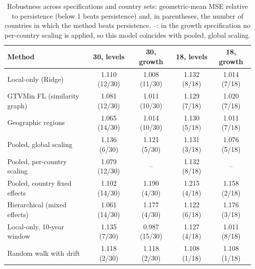 \begin{table}[htbp]
\centering
\caption{Robustness across specifications and country sets: geometric-mean MSE relative to persistence (below 1 beats persistence) and, in parentheses, the number of countries in which the method beats persistence. --: in the growth specification no per-country scaling is applied, so this model coincides with pooled, global scaling.}
\label{tab:robustness}
\begin{tabular}{lcccc}
\toprule
Method & 30, levels & 30, growth & 18, levels & 18, growth \\
\midrule
Local-only (Ridge) & 1.110 (12/30) & 1.008 (11/30) & 1.132 (8/18) & 1.014 (7/18) \\
GTVMin FL (similarity graph) & 1.081 (12/30) & 1.011 (10/30) & 1.129 (7/18) & 1.020 (7/18) \\
Geographic regions & 1.065 (14/30) & 1.014 (10/30) & 1.130 (5/18) & 1.011 (7/18) \\
Pooled, global scaling & 1.136 (6/30) & 1.121 (5/30) & 1.131 (3/18) & 1.076 (5/18) \\
Pooled, per-country scaling & 1.079 (12/30) & -- & 1.132 (8/18) & -- \\
Pooled, country fixed effects & 1.102 (14/30) & 1.190 (4/30) & 1.215 (4/18) & 1.158 (2/18) \\
Hierarchical (mixed effects) & 1.061 (14/30) & 1.177 (4/30) & 1.122 (6/18) & 1.176 (3/18) \\
Local-only, 10-year window & 1.135 (7/30) & 0.987 (15/30) & 1.127 (4/18) & 1.011 (8/18) \\
Random walk with drift & 1.118 (2/30) & 1.118 (2/30) & 1.108 (1/18) & 1.108 (1/18) \\
\bottomrule
\end{tabular}
\end{table}
